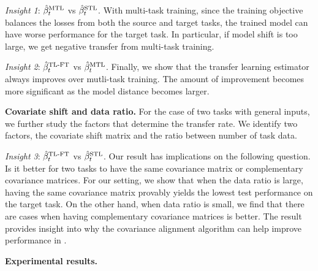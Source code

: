 	{\it Insight 1}: $\hat{\beta}_t^{\text{MTL}}$ vs $\hat{\beta}_t^{\text{STL}}$.
	With multi-task training, since the training objective balances the losses from both the source and target tasks, the trained model can have worse performance for the target task.
	In particular, if model shift is too large, we get negative transfer from multi-task training.

	{\it Insight 2}: $\hat{\beta}_t^{\text{TL-FT}}$ vs $\hat{\beta}_t^{\text{MTL}}$.
	Finally, we show that the transfer learning estimator always improves over mutli-task training.
	The amount of improvement becomes more significant as the model distance becomes larger.



\smallskip
	\noindent\textbf{Covariate shift and data ratio.}
	For the case of two tasks with general inputs, we further study the factors that determine the transfer rate.
	We identify two factors, the covariate shift matrix and the ratio between number of task data.

	\textit{Insight 3}: $\hat{\beta}_t^{\text{TL-FT}}$ vs $\hat{\beta}_t^{\text{STL}}$.
	Our result has implications on the following question.
	Is it better for two tasks to have the same covariance matrix or complementary covariance matrices.
	For our setting, we show that when the data ratio is large, having the same covariance matrix provably yields the lowest test performance on the target task.
	On the other hand, when data ratio is small, we find that there are cases when having complementary covariance matrices is better.
	The result provides insight into why the covariance alignment algorithm can help improve performance in \cite{WZR20}.

\smallskip
	\noindent\textbf{Experimental results.}


